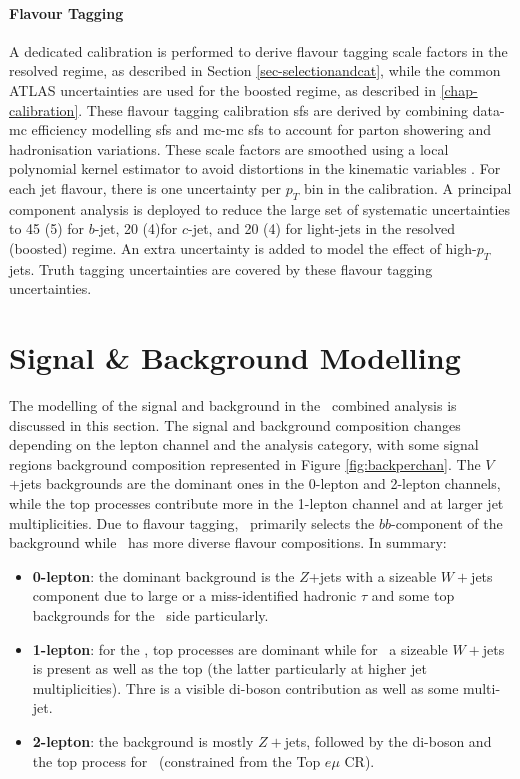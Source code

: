 \paragraph{Flavour Tagging} A dedicated calibration is performed to derive flavour tagging scale factors in the resolved regime, as described in Section \ref{sec-selectionandcat}, while the common ATLAS uncertainties are used for the boosted regime, as described in \ref{chap-calibration}. These flavour tagging calibration \gls{sf}s are derived by combining data-\gls{mc} efficiency modelling \gls{sf}s and \gls{mc}-\gls{mc} \gls{sf}s to account for parton showering and hadronisation variations. These scale factors are smoothed using a local polynomial kernel estimator to avoid distortions in the kinematic variables \cite{ATL-PHYS-PUB-2020-004}. For each jet flavour, there is one uncertainty per $p_T$ bin in the calibration. A principal component analysis is deployed to reduce the large set of systematic uncertainties to 45 (5) for $b$-jet, 20 (4)for $c$-jet, and 20 (4) for light-jets in the resolved (boosted) regime. An extra uncertainty is added to model the effect of high-$p_T$ jets. Truth tagging uncertainties are covered by these flavour tagging uncertainties.

\section{Signal \& Background Modelling}\label{sec-mod}
The modelling of the signal and background in the \vhbc\ combined analysis is discussed in this section. The signal and background composition changes depending on the lepton channel and the analysis category, with some signal regions background composition represented in Figure \ref{fig:backperchan}. The $V$+jets backgrounds are the dominant ones in the 0-lepton and 2-lepton channels, while the top processes contribute more in the 1-lepton channel and at larger jet multiplicities. Due to flavour tagging, \vhb\ primarily selects the $bb$-component of the background while \vhc\ has more diverse flavour compositions. In summary:
\begin{itemize}
    \item \textbf{0-lepton}: the dominant background is the $Z$+jets with a sizeable $W+$jets component due to large \etm or a miss-identified hadronic $\tau$ and some top backgrounds for the \vhb\ side particularly.
    \item \textbf{1-lepton}: for the \vhb, top processes are dominant while for \vh\ a sizeable $W+$jets is present as well as the top (the latter particularly at higher jet multiplicities). Thre is a visible di-boson contribution as well as some multi-jet.  
    \item \textbf{2-lepton}: the background is mostly $Z+$jets, followed by the di-boson and the top process for \vhb\ (constrained from the Top $e\mu$ CR). 
\end{itemize}

